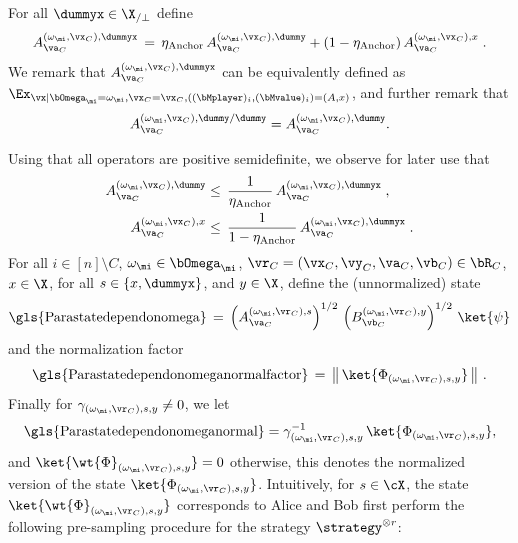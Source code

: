 For all $\dummyx \in \X_{/\perp}$ define 
\begin{equation}
	\label{eq:states-operators-3}
	A^{(\omega_\mi,\vx_C),\dummyx}_{\va_C} \,=\, \eta_{\text{Anchor}} \, A^{(\omega_\mi,\vx_C),\dummy}_{\va_C} + (1 - \eta_{\text{Anchor}}) \, A^{(\omega_\mi,\vx_C),x}_{\va_C}\;.
\end{equation}
We remark that $A^{(\omega_\mi,\vx_C),\dummyx}_{\va_C}$ can be equivalently defined as $\Ex_{\vx | \bOmega_\mi = \omega_\mi, \vx_C = \vx_C, ((\bMplayer)_i, (\bMvalue)_i) = (A, x)}$, and further remark that 
\begin{equation}	\label{eq:states-operators-4}
	A^{(\omega_\mi,\vx_C),\dummy / \dummy}_{\va_C} = 	A^{(\omega_\mi,\vx_C),\dummy}_{\va_C}.
\end{equation}

Using that all operators are positive semidefinite, we observe for later use that
\begin{align}
	A^{(\omega_\mi,\vx_C),\dummy}_{\va_C} &\leq\, \frac{1}{\eta_{\text{Anchor}}}\, A^{(\omega_\mi,\vx_C),\dummyx}_{\va_C}\;,\label{eq:states-operators-3a}\\
	A^{(\omega_\mi,\vx_C),x}_{\va_C} &\leq\, \frac{1}{ 1 - \eta_{\text{Anchor}}}\, A^{(\omega_\mi,\vx_C),\dummyx}_{\va_C}\;.\label{eq:states-operators-3b}
\end{align}
For all $i \in [n] \setminus C$, $\omega_\mi \in \bOmega_\mi$, $\vr_C = (\vx_C, \vy_C, \va_C, \vb_C) \in \bR_C$, $x \in \X$, for all $s \in \{x,\dummyx\}$, and $y \in \X$, define the (unnormalized) state
\begin{equation}\label{eq:def-state-y}
	\text{\gls{Parastatedependonomega}} \,=\, \left(A^{(\omega_\mi, \vr_C),s}_{\va_C}\right)^{1/2} \, \left(B^{(\omega_\mi, \vr_C),y}_{\vb_C}\right)^{1/2} \, \ket{\psi}
\end{equation}
and the normalization factor
\begin{equation} \label{eq:def-gamma}
	\text{\gls{Parastatedependonomeganormalfactor}} \,=\, \big \| \, \ket{\Phi_{(\omega_\mi, \vr_C ),s,y}} \, \big \|~.
\end{equation}
Finally for $\gamma_{(\omega_\mi, \vr_C ),s,y} \neq 0$, we let
\begin{equation}\label{eq:def-psitt}
	\text{\gls{Parastatedependonomeganormal}} = \gamma_{(\omega_\mi, \vr_C ),s,y}^{-1} \, \ket{\Phi_{(\omega_\mi, \vr_C ),s,y}},
\end{equation}
and $\ket{\wt{\Phi}_{(\omega_\mi, \vr_C ),s,y}}  = 0$ otherwise, this denotes the normalized version of the state $\ket{\Phi_{(\omega_{\mi}, \vr_C),s,y}}$. Intuitively, for $s \in \cX$, the state $\ket{\wt{\Phi}_{(\omega_\mi, \vr_C ),s,y}}$ corresponds to Alice and Bob first perform the following pre-sampling procedure for the strategy $\strategy^{\otimes r}$: 
